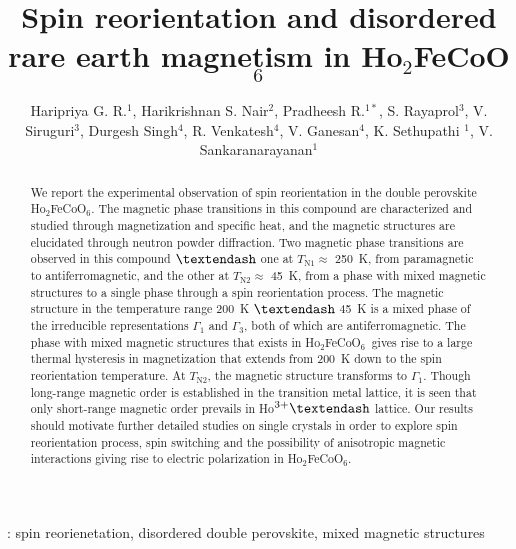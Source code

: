 \documentclass[12pt,twocolumns]{iopart}
\newcommand{\HFCO}{Ho$_2$FeCoO$_6$}
\begin{document}
%
%
%
\title[Spin reorientation and disordered rare earth magnetism in Ho$_2$FeCoO$_6$]{Spin reorientation and disordered rare earth magnetism in Ho$_2$FeCoO$_6$}
\author{Haripriya G. R.$^{1}$, Harikrishnan S. Nair$^2$, Pradheesh R.$^{1*}$, S. Rayaprol$^3$, V. Siruguri$^3$, Durgesh Singh$^4$, R. Venkatesh$^4$, V. Ganesan$^4$,  K. Sethupathi $^{1}$, V. Sankaranarayanan$^1$ }
\address{$^1$Low Temperature Physics Laboratory, Department of Physics, Indian Institute of Technology Madras, Chennai-600036, India}
\address{$^2$ Department of Physics, 500 West University Ave, University of Texas at El Paso, TX 79968, USA}
\address{$^3$ UGC-DAE Consortium for Scientific Research - Mumbai Centre, R-5 Shed, BARC Campus, Mumbai-400085, India}
\address{$^4$Low Temperature Laboratory, UGC-DAE Consortium for Scientific Research, University Campus, Khandwa Road, Indore-452001, India}
\address{$*$Current address: Department of Physics, National Institute of Technology Calicut, Kozhikode - 673601, Kerala, India}
%
%
\clearpage
\begin{abstract}
We report the experimental observation of spin reorientation in the double perovskite \HFCO. 
The magnetic phase transitions in this compound are characterized and studied through magnetization and specific heat, and the magnetic structures are elucidated through neutron powder diffraction.
Two magnetic phase transitions are observed in this compound $\textendash$ one at $T_\mathrm{N1} \approx$ 250~K, from paramagnetic to antiferromagnetic, and the other at $T_\mathrm{N2} \approx$ 45~K, from a phase with mixed magnetic structures to a single phase through a spin reorientation process. The magnetic structure in the temperature range 200~K $\textendash$ 45~K is a mixed phase of the irreducible representations $\Gamma_1$ and $\Gamma_3$, both of which are antiferromagnetic. The phase with mixed magnetic structures that exists in \HFCO\ gives rise to a large thermal hysteresis in magnetization that extends from 200~K down to the spin reorientation temperature. At $T_\mathrm{N2}$, the magnetic structure transforms to $\Gamma_1$.
Though long-range magnetic order is established in the transition metal lattice, it is seen that only short-range magnetic order prevails in Ho$^{3+}\textendash$ lattice. Our results should motivate further detailed studies on single crystals in order to explore spin reorientation process, spin switching and the possibility of anisotropic magnetic interactions giving rise to electric polarization in \HFCO.
\end{abstract}
%
: spin reorienetation, disordered double perovskite, mixed magnetic structures
\end{document}
